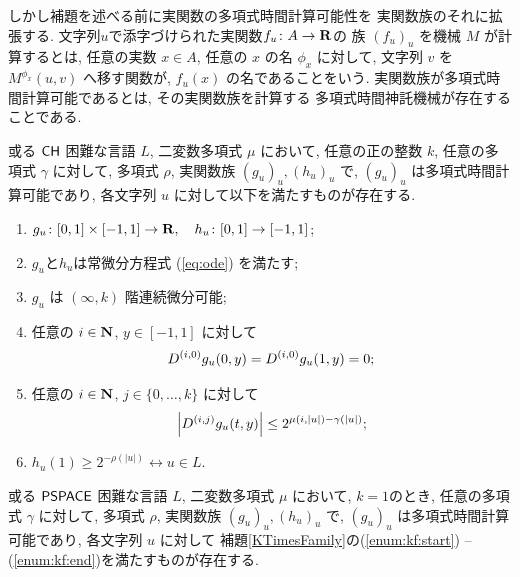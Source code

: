 しかし補題を述べる前に実関数の多項式時間計算可能性を
実関数族のそれに拡張する.
文字列$u$で添字づけられた実関数$f _u \colon A \to \mathbf R$の
族 $(f_u)_u$ を機械 $M$ が計算するとは,
任意の実数 $x \in A$, 任意の $x$ の名 $\phi_x$ に対して,
文字列 $v$ を $M ^{\phi _x} (u, v)$ へ移す関数が, 
$f _u (x)$ の名であることをいう.
実関数族が多項式時間計算可能であるとは, その実関数族を計算する
多項式時間神託機械が存在することである.

 \begin{lemma}
  \label{KTimesFamily}
  或る $\mathsf{CH}$ 困難な言語 $L$,
  二変数多項式 $\mu$ において,
  任意の正の整数 $k$,
  任意の多項式 $\gamma$ に対して,
  多項式 $\rho$, 実関数族 $(g_u)_u, (h_u)_u$ で, 
  $(g_u)_u$ は多項式時間計算可能であり,
  各文字列 $u$ に対して以下を満たすものが存在する.

  \begin{enumerate}
   \item \label{enum:kf:start}
     $g_u\colon [0,1] \times [-1,1]\to \mathbf R, \quad h_u\colon [0,1] \to [-1,1]$; 
   \item $g_u$と$h_u$は常微分方程式 (\ref{eq:ode}) を満たす;
   \item $g_u$ は $(\infty, k)$ 階連続微分可能;
   \item \label{enum:boundary}
	 任意の $i \in \mathbf N$, $y \in [-1,1]$ に対して
	 \begin{equation*}
	  D^{(i, 0)} g_u(0,y) = D^{(i, 0)} g_u(1,y) = 0 ;
	 \end{equation*}
   \item \label{enum:inftyk}
	 任意の $i \in \mathbf N$, $j \in \{0, \dots, k\}$ に対して
	 \begin{equation*}
	  \left|D^{(i,j)} g_u(t,y)\right| \le 2^{\mu(i, |u|) - \gamma(|u|)};
	 \end{equation*}
   \item \label{enum:kf:end}
	 $h_u(1) \ge 2^{-\rho(|u|)} \longleftrightarrow u \in L$.
  \end{enumerate}
 \end{lemma}

\begin{lemma}
 \label{DifferentiableFamily}
 或る $\mathsf{PSPACE}$ 困難な言語 $L$,
 二変数多項式 $\mu$ において,
 $k = 1$のとき,
 任意の多項式 $\gamma$ に対して,
 多項式 $\rho$, 実関数族 $(g_u)_u, (h_u)_u$ で, 
 $(g_u)_u$ は多項式時間計算可能であり,
 各文字列 $u$ に対して
 補題\ref{KTimesFamily}の(\ref{enum:kf:start}) -- (\ref{enum:kf:end})を満たすものが存在する.
\end{lemma}



